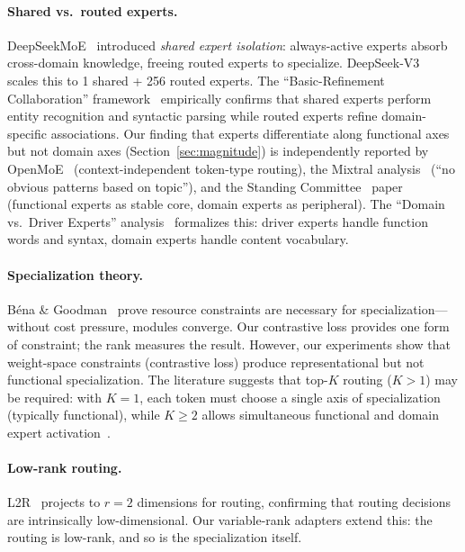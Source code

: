 \documentclass{article}
\begin{document}
\paragraph{Shared vs.\ routed experts.}
DeepSeekMoE~\cite{deepseek2024moe} introduced \emph{shared expert isolation}:
always-active experts absorb cross-domain knowledge, freeing routed experts to
specialize. DeepSeek-V3~\cite{deepseekv3} scales this to 1 shared + 256
routed experts. The ``Basic-Refinement Collaboration''
framework~\cite{basicrefinement2025} empirically confirms that shared experts
perform entity recognition and syntactic parsing while routed experts refine
domain-specific associations. Our finding that experts differentiate along
functional axes but not domain axes (Section~\ref{sec:magnitude}) is
independently reported by OpenMoE~\cite{openmoe2024} (context-independent
token-type routing), the Mixtral analysis~\cite{mixtral2024} (``no obvious
patterns based on topic''), and the Standing
Committee~\cite{standing2026} paper (functional experts as stable core, domain
experts as peripheral). The ``Domain vs.\ Driver Experts''
analysis~\cite{domaindriver2026} formalizes this: driver experts handle
function words and syntax, domain experts handle content vocabulary.

\paragraph{Specialization theory.}
B\'{e}na \& Goodman~\cite{bena2025modularity} prove resource constraints are
necessary for specialization---without cost pressure, modules converge. Our
contrastive loss provides one form of constraint; the rank measures the result.
However, our experiments show that weight-space constraints (contrastive loss)
produce representational but not functional specialization. The literature
suggests that top-$K$ routing ($K > 1$) may be required: with $K=1$, each
token must choose a single axis of specialization (typically functional), while
$K \geq 2$ allows simultaneous functional and domain expert
activation~\cite{standing2026, domaindriver2026}.

\paragraph{Low-rank routing.}
L2R~\cite{l2r2026} projects to $r{=}2$ dimensions for routing, confirming that
routing decisions are intrinsically low-dimensional. Our variable-rank adapters
extend this: the routing is low-rank, and so is the specialization itself.
\end{document}

